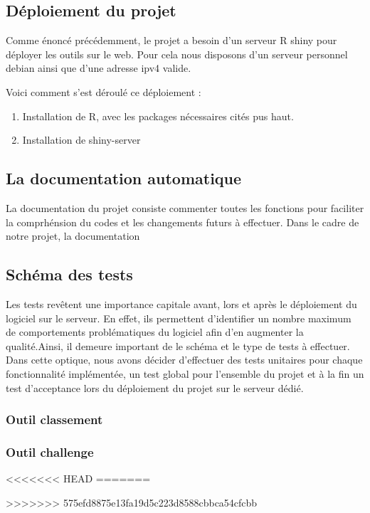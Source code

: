 \subsection {Déploiement du projet}

Comme énoncé précédemment, le projet a besoin d'un serveur R shiny pour déployer les outils sur le web.
Pour cela nous disposons d'un serveur personnel debian ainsi que d'une adresse ipv4 valide.

Voici comment s'est déroulé ce déploiement :

\begin{enumerate} 
	\item Installation de R, avec les packages nécessaires cités pus haut. \cite{ref2}
	\item Installation de shiny-server \cite{ref3}
\end{enumerate}


\subsection {La documentation automatique}
La documentation du projet consiste commenter toutes les fonctions pour faciliter la comprhénsion du codes et les changements futurs à effectuer.
Dans le cadre de notre projet,  la documentation  


\subsection {Schéma des tests}
Les tests revêtent une importance capitale avant, lors et après le déploiement du logiciel sur le serveur. En effet, ils permettent d'identifier un nombre maximum de comportements problématiques du logiciel afin d'en augmenter la qualité.Ainsi, il demeure important de  le schéma et le type de tests à effectuer. \\
Dans cette optique, nous avons décider d'effectuer des tests unitaires pour chaque fonctionnalité implémentée, un test global pour l'ensemble du projet et à la fin un test d'acceptance lors du déploiement du projet sur le serveur dédié.

\subsubsection{Outil classement}

\subsubsection{Outil challenge}

<<<<<<< HEAD
=======


>>>>>>> 575efd8875e13fa19d5c223d8588cbbca54cfcbb
